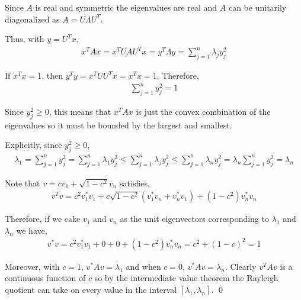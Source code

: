 \documentclass[10pt]{article}
\begin{document}
\begin{solution}[Solution]
Since \( A \) is real and symmetric the eigenvalues are real and \( A \) can be unitarily diagonalized as \( A = U\Lambda U^T \).

Thus, with \( y = U^Tx \),
\begin{align*}
    x^TAx = x^TUAU^Tx = y^T\Lambda y = \sum_{j=1}^{n} \lambda_j y_j^2
\end{align*}

If \( x^Tx = 1 \), then \( y^Ty = x^TUU^Tx = x^Tx = 1 \). Therefore,
\begin{align*}
    \sum_{j=1}^{n} y_j^2 = 1
\end{align*}

Since \( y_j^2 \geq 0 \), this means that \( x^TAx \) is just the convex combination of the eigenvalues so it must be bounded by the largest and smallest.

Explicitly, since \( y_j^2 \geq 0 \),
\begin{align*}
    \lambda_1
    = \sum_{j=1}^{n} y_j^2
    = \sum_{j=1}^{n} \lambda_1 y_j^2
    \leq \sum_{j=1}^{n} \lambda_j y_j^2
    \leq \sum_{j=1}^{n} \lambda_n y_j^2
    = \lambda_n \sum_{j=1}^{n} y_j^2
    = \lambda_n
\end{align*}

Note that \( v = c v_1 + \sqrt{1-c^2} v_n \) satisfies,
\begin{align*}
    v^Tv = c^2 v_1^*v_1 + c\sqrt{1-c^2} (v_1^*v_n + v_n^*v_1) + (1-c^2)v_n^*v_n
\end{align*}

Therefore, if we cake \( v_1 \) and \( v_n \) as the unit eigenvectors corresponding to \( \lambda_1 \) and \( \lambda_n \) we have,
\begin{align*}
    v^*v = c^2 v_1^*v_1 + 0 + 0 + (1-c^2)v_n^*v_n = c^2 + (1-c)^2 = 1
\end{align*}

Moreover, with \( c = 1 \), \( v^*Av = \lambda_1 \) and when \( c=0 \), \( v^*Av = \lambda_n \). Clearly \( v^TAv \) is a continuous function of \( c \) so by the intermediate value theorem the Rayleigh quotient can take on every value in the interval \( [\lambda_1, \lambda_n] \). \qed

\end{solution}
\end{document}
